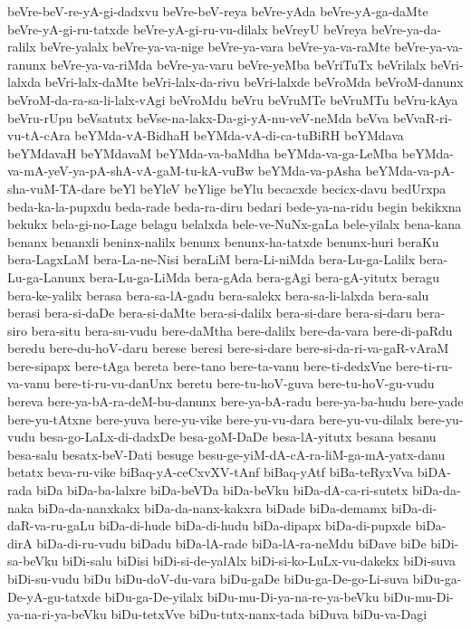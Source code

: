{beVre-beV-re-yA-gi-dadxvu
beVre-beV-reya
beVre-yAda
beVre-yA-ga-daMte
beVre-yA-gi-ru-tatxde
beVre-yA-gi-ru-vu-dilalx
beVreyU
beVreya
beVre-ya-da-ralilx
beVre-yalalx
beVre-ya-va-nige
beVre-ya-vara
beVre-ya-va-raMte
beVre-ya-va-ranunx
beVre-ya-va-riMda
beVre-ya-varu
beVre-yeMba
beVriTuTx
beVrilalx
beVri-lalxda
beVri-lalx-daMte
beVri-lalx-da-rivu
beVri-lalxde
beVroMda
beVroM-danunx
beVroM-da-ra-sa-li-lalx-vAgi
beVroMdu
beVru
beVruMTe
beVruMTu
beVru-kAya
beVru-rUpu
beVsatutx
beVse-na-lakx-Da-gi-yA-nu-veV-neMda
beVva
beVvaR-ri-vu-tA-cAra
beYMda-vA-BidhaH
beYMda-vA-di-ca-tuBiRH
beYMdava
beYMdavaH
beYMdavaM
beYMda-va-baMdha
beYMda-va-ga-LeMba
beYMda-va-mA-yeV-ya-pA-shA-vA-gaM-tu-kA-vuBw
beYMda-va-pAsha
beYMda-va-pA-sha-vuM-TA-dare
beYl
beYleV
beYlige
beYlu
becacxde
becicx-davu
bedUrxpa
beda-ka-la-pupxdu
beda-rade
beda-ra-diru
bedari
bede-ya-na-ridu
begin
bekikxna
bekukx
bela-gi-no-Lage
belagu
belalxda
bele-ve-NuNx-gaLa
bele-yilalx
bena-kana
benanx
benanxli
beninx-nalilx
benunx
benunx-ha-tatxde
benunx-huri
beraKu
bera-LagxLaM
bera-La-ne-Nisi
beraLiM
bera-Li-niMda
bera-Lu-ga-Lalilx
bera-Lu-ga-Lanunx
bera-Lu-ga-LiMda
bera-gAda
bera-gAgi
bera-gA-yitutx
beragu
bera-ke-yalilx
berasa
bera-sa-lA-gadu
bera-salekx
bera-sa-li-lalxda
bera-salu
berasi
bera-si-daDe
bera-si-daMte
bera-si-dalilx
bera-si-dare
bera-si-daru
bera-siro
bera-situ
bera-su-vudu
bere-daMtha
bere-dalilx
bere-da-vara
bere-di-paRdu
beredu
bere-du-hoV-daru
berese
beresi
bere-si-dare
bere-si-da-ri-va-gaR-vAraM
bere-sipapx
bere-tAga
bereta
bere-tano
bere-ta-vanu
bere-ti-dedxVne
bere-ti-ru-va-vanu
bere-ti-ru-vu-danUnx
beretu
bere-tu-hoV-guva
bere-tu-hoV-gu-vudu
bereva
bere-ya-bA-ra-deM-bu-danunx
bere-ya-bA-radu
bere-ya-ba-hudu
bere-yade
bere-yu-tAtxne
bere-yuva
bere-yu-vike
bere-yu-vu-dara
bere-yu-vu-dilalx
bere-yu-vudu
besa-go-LaLx-di-dadxDe
besa-goM-DaDe
besa-lA-yitutx
besana
besanu
besa-salu
besatx-beV-Dati
besuge
besu-ge-yiM-dA-cA-ra-liM-ga-mA-yatx-danu
betatx
beva-ru-vike
biBaq-yA-ceCxvXV-tAnf
biBaq-yAtf
biBa-teRyxVva
biDA-rada
biDa
biDa-ba-lalxre
biDa-beVDa
biDa-beVku
biDa-dA-ca-ri-sutetx
biDa-da-naka
biDa-da-nanxkakx
biDa-da-nanx-kakxra
biDade
biDa-demamx
biDa-di-daR-va-ru-gaLu
biDa-di-hude
biDa-di-hudu
biDa-dipapx
biDa-di-pupxde
biDa-dirA
biDa-di-ru-vudu
biDadu
biDa-lA-rade
biDa-lA-ra-neMdu
biDave
biDe
biDi-sa-beVku
biDi-salu
biDisi
biDi-si-de-yalAlx
biDi-si-ko-LuLx-vu-dakekx
biDi-suva
biDi-su-vudu
biDu
biDu-doV-du-vara
biDu-gaDe
biDu-ga-De-go-Li-suva
biDu-ga-De-yA-gu-tatxde
biDu-ga-De-yilalx
biDu-mu-Di-ya-na-re-ya-beVku
biDu-mu-Di-ya-na-ri-ya-beVku
biDu-tetxVve
biDu-tutx-nanx-tada
biDuva
biDu-va-Dagi
}
